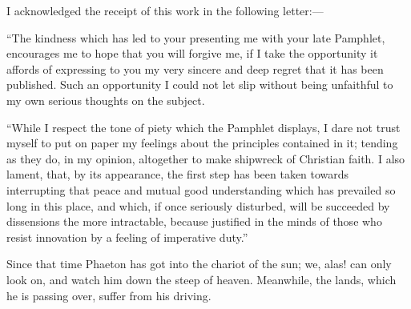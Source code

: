 I acknowledged the receipt of this work in the following letter:—

``The kindness which has led to your presenting me with your late
Pamphlet, encourages me to hope that you will forgive me, if I take the
opportunity it affords of expressing to you my very sincere and deep
regret that it has been published. Such an opportunity I could not let
slip without being unfaithful to my own serious thoughts on the subject.

``While I respect the tone of piety which the Pamphlet displays,
I dare not trust myself to put on paper my feelings about the principles
contained in it; tending as they do, in my opinion, altogether to make
shipwreck of Christian faith. I also lament, that, by its appearance,
the first step has been taken towards interrupting that peace and mutual
good understanding which has prevailed so long in this place, and which,
if once seriously disturbed, will be succeeded by dissensions the more
intractable, because justified in the minds of those who resist
innovation by a feeling of imperative duty.''

Since that time Phaeton has got into the chariot of the sun; we,
alas! can only look on, and watch him down the steep of heaven.
Meanwhile, the lands, which he is passing over, suffer from his driving.

